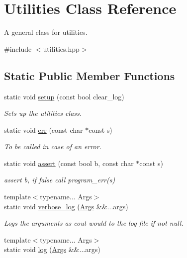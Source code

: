 \hypertarget{class_utilities}{}\section{Utilities Class Reference}
\label{class_utilities}


A general class for utilities.  




{\ttfamily \#include $<$utilities.\+hpp$>$}

\subsection*{Static Public Member Functions}
\begin{DoxyCompactItemize}
\item 
static void \hyperlink{class_utilities_aa448e199bdc43fe62e9b9b989a7f667b}{setup} (const bool clear\+\_\+log)
\begin{DoxyCompactList}\small\item\em Sets up the utilities class. \end{DoxyCompactList}\item 
static void \hyperlink{class_utilities_a5308da50597c93aad2b1ca2ecfbcb723}{err} (const char $\ast$const s)
\begin{DoxyCompactList}\small\item\em To be called in case of an error. \end{DoxyCompactList}\item 
static void \hyperlink{class_utilities_a22c85a2970e168ca0b9ad6fd86752792}{assert} (const bool b, const char $\ast$const s)
\begin{DoxyCompactList}\small\item\em assert b, if false call program\+\_\+err(s) \end{DoxyCompactList}\item 
{\footnotesize template$<$typename... Args$>$ }\\static void \hyperlink{class_utilities_ad7251bf1dd140719a5ff384d81dc4ac0}{verbose\+\_\+log} (\hyperlink{struct_args}{Args} \&\&...args)
\begin{DoxyCompactList}\small\item\em Logs the arguments as cout would to the log file if not null. \end{DoxyCompactList}\item 
{\footnotesize template$<$typename... Args$>$ }\\static void \hyperlink{class_utilities_a996db67175e47946e80539602c2ca6ee}{log} (\hyperlink{struct_args}{Args} \&\&...args)

\end{DoxyCompactItemize}
